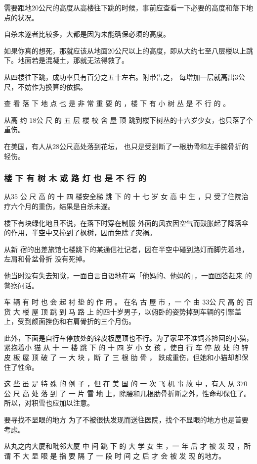 \documentclass[UTF8]{ctexart}
\begin{document}
需要距地$20$公尺的高度从高楼往下跳的时候，事前应查看一下必要的高度和落下地点的状况。

自杀未遂者比较多，大都是因为未能确保必须的高度。

如果你真的想死，那就应该从地面$20$公尺以上的高度，即从大约七至八层楼以上跳下。地面若是混凝土，那就无法得救了。

从四楼往下跳，成功率只有百分之五十左右。附带告之， 每增加一层就高出$3$公尺，不妨作为换算的依据。

查 看 落 下 地 点 也 是 非 常 重 要 的 ，楼 下 有 小 树 丛 是 不 行 的 。

从高 约 $18$公 尺 的 五 层 楼 校 舍 屋 顶 跳到楼下树丛的十六岁少女，也只落了个重伤。

在美国，有人从$28$公尺高处落到花坛， 也只是受到断了一根肋骨和左手腕骨折的轻伤。

\subsubsection*{楼 下 有 树 木 或 路 灯 也 是 不 行 的}

从$35$ 公 尺 高 的 十 四 楼安全梯 跳 下 的 十 七 岁 女 高 中 生 ，只 受了住院治疗六个月的重伤，结果是自杀未遂。

楼下有块绿化地且不说，在落下时穿在制服 外面的风衣因空气而鼓胀起了降落伞的作用，半空中又撞到了枫树，因而免除了灾祸。

从新 宿的出差旅馆七楼跳下的某通信社记者，因在半空中碰到路灯而脚先着地，左肩和骨盆骨折 没有死掉。

他当时没有失去知觉，一面自言自语地在骂「他妈的、他妈的」，一面回答赶来 的警察问话。

车 辆 有 时 也 会 起 衬 垫 的 作 用 。
在名 古 屋 市 ，一 个 由 $33$公 尺 高 的 百 货 大 楼 屋 顶 跳 到 马 路 上 的四十岁男子，以俯卧的姿势掉到车辆的引擎盖上，受到颜面挫伤和右肩骨折的三个月伤。

此外，下面是自行车停放处的锌皮板屋顶也不行。为了家里不准饲养捡回的小猫，紧抱着小 猫 从 十 一 楼 跳 下 的 十 四 岁 小 女 孩 ，使自 行 车 停 放 处 的 锌 皮 板 屋 顶 破 了 一 大 块 ，断 了 三 根 肋 骨 ， 跌成重伤，但她和小猫却都保住了性命。

这 些 虽 是 特 殊 的 例 子 ，但 在 美 国 的 一 次 飞 机 事 故 中 ，有人 从 $370$公 尺 高 处 落 到 了 一 片 雪 地 上，除腰和几根肋骨折断之外，性命却保住了。所以，对积雪也应加以注意。

要寻找不显眼的地方 为了不被很快发现而送往医院，找个不显眼的地方也是首要考虑。

从丸之内大厦和毗邻大厦 中 间 跳 下 的 大 学 女 生 ，一 年 后 才 被 发 现 ，所谓 不 大 显 眼 是 指 要 隔 了 一 段 时 间 之 后 才 会 被 发 现 的地方。
\end{document}

